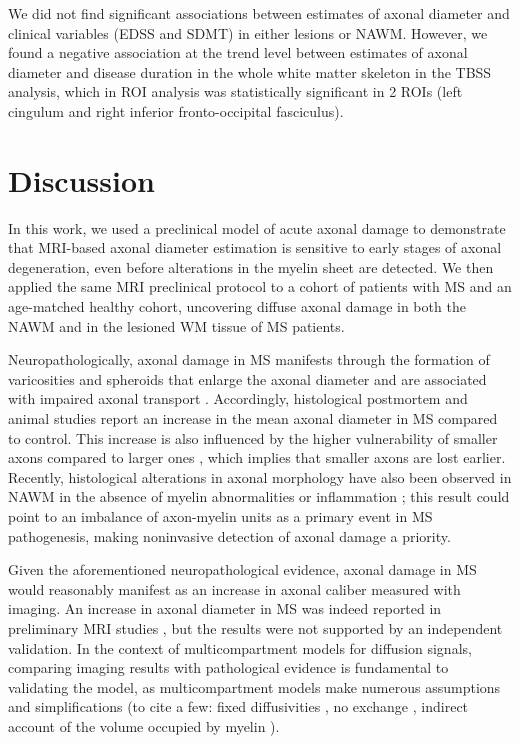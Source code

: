 \documentclass[11pt]{article}
\begin{document}
We did not find significant associations between estimates of axonal diameter and clinical variables (EDSS and SDMT) in either lesions or NAWM. However, we found a negative association at the trend level between estimates of axonal diameter and disease duration in the whole white matter skeleton in the TBSS analysis, which in ROI analysis was statistically significant in 2 ROIs (left cingulum and right inferior fronto-occipital fasciculus).

\section{Discussion}
In this work, we used a preclinical model of acute axonal damage to demonstrate that MRI-based axonal diameter estimation is sensitive to early stages of axonal degeneration, even before alterations in the myelin sheet are detected. We then applied the same MRI preclinical protocol to a cohort of patients with MS and an age-matched healthy cohort, uncovering diffuse axonal damage in both the NAWM and in the lesioned WM tissue of MS patients.

Neuropathologically, axonal damage in MS manifests through the formation of varicosities and spheroids that enlarge the axonal diameter and are associated with impaired axonal transport \cite{Criste2014}. Accordingly, histological postmortem \cite{Bergers2002} and animal studies \cite{Nikic2011} report an increase in the mean axonal diameter in MS compared to control. This increase is also influenced by the higher vulnerability of smaller axons compared to larger ones \cite{Tallantyre2010}, which implies that smaller axons are lost earlier. Recently, histological alterations in axonal morphology have also been observed in NAWM in the absence of myelin abnormalities or inflammation \cite{Luchicchi2021}; this result could point to an imbalance of axon-myelin units as a primary event in MS pathogenesis, making noninvasive detection of axonal damage a priority.

Given the aforementioned neuropathological evidence, axonal damage in MS would reasonably manifest as an increase in axonal caliber measured with imaging. An increase in axonal diameter in MS was indeed reported in preliminary MRI studies \cite{Huang2016}, but the results were not supported by an independent validation. In the context of multicompartment models for diffusion signals, comparing imaging results with pathological evidence is fundamental to validating the model, as multicompartment models make numerous assumptions and simplifications (to cite a few: fixed diffusivities \cite{Alexander2010}, no exchange \cite{Lasic2011}, indirect account of the volume occupied by myelin \cite{Assaf2008}).
\end{document}
